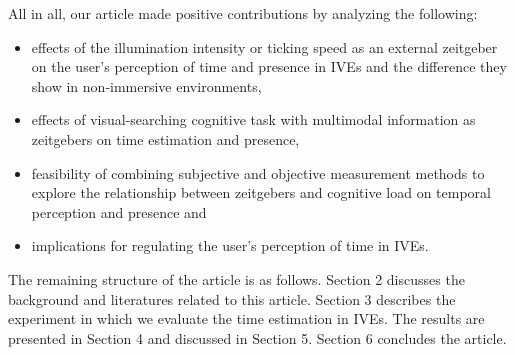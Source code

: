 \documentclass[sigconf]{acmart}
\begin{document}



All in all, our article made positive contributions by analyzing the following:
\begin{itemize}
\item effects of the illumination intensity or ticking speed as an external zeitgeber on the user's perception of time and presence in IVEs and the difference they show in non-immersive environments,
\item effects of visual-searching cognitive task with multimodal information as zeitgebers on time estimation and presence,
\item feasibility of combining subjective and objective measurement methods to explore the relationship between zeitgebers and cognitive load on temporal perception and presence and
\item implications for regulating the user's perception of time in IVEs.
\end{itemize}

The remaining structure of the article is as follows. Section 2 discusses the background and literatures related to this article. Section 3 describes the experiment in which we evaluate the time estimation in IVEs. The results are presented in Section 4 and discussed in Section 5. Section 6 concludes the article.

\end{document}
